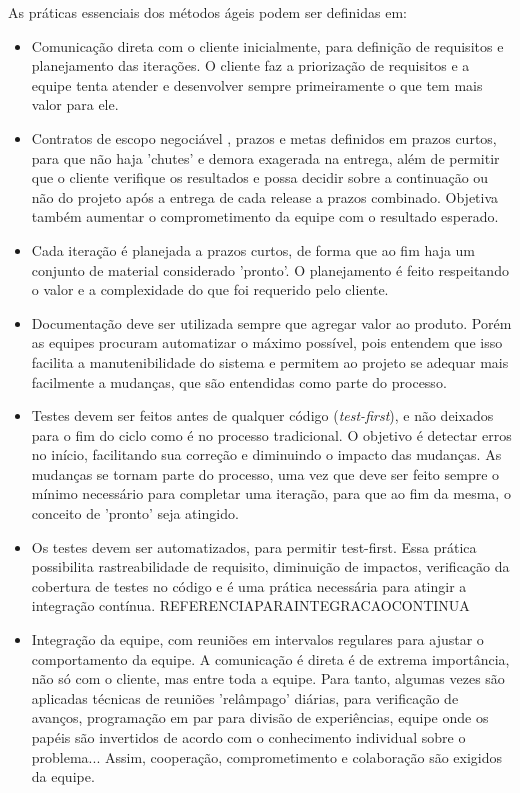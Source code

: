 As práticas essenciais dos métodos ágeis podem ser definidas em:
\begin{itemize}

\item Comunicação direta com o cliente inicialmente, para definição de requisitos e planejamento das iterações. O cliente faz a priorização de requisitos e a equipe tenta atender e desenvolver sempre primeiramente o que tem mais valor para ele. 

\item Contratos de escopo negociável , prazos e metas definidos em prazos curtos, para que não haja 'chutes' e demora exagerada na entrega, além de permitir que o cliente verifique os resultados e possa decidir sobre a continuação ou não do projeto após a entrega de cada release a prazos combinado. Objetiva também aumentar o comprometimento da equipe com o resultado esperado.

\item Cada iteração é planejada a prazos curtos, de forma que ao fim haja um conjunto de material considerado 'pronto'. O planejamento é feito respeitando o valor e a complexidade do que foi requerido pelo cliente.

\item Documentação deve ser utilizada sempre que agregar valor ao produto. Porém as equipes procuram automatizar o máximo possível, pois entendem que isso facilita a manutenibilidade do sistema e permitem ao projeto se adequar mais facilmente a mudanças, que são entendidas como parte do processo.

\item Testes devem ser feitos antes de qualquer código (\textit{test-first}), e não deixados para o fim do ciclo como é no processo tradicional. O objetivo é detectar erros no início, facilitando sua correção e diminuindo o impacto das mudanças. As mudanças se tornam parte do processo, uma vez que deve ser feito sempre o mínimo necessário para completar uma iteração, para que ao fim da mesma, o conceito de 'pronto' seja atingido.

\item Os testes devem ser automatizados, para permitir test-first. Essa prática possibilita rastreabilidade de requisito, diminuição de impactos, verificação da cobertura de testes no código e é uma prática necessária para atingir a integração contínua. REFERENCIAPARAINTEGRACAOCONTINUA

\item Integração da equipe, com reuniões em intervalos regulares para ajustar o comportamento da equipe. A comunicação é direta é de extrema importância, não só com o cliente, mas entre toda a equipe. Para tanto, algumas vezes são aplicadas técnicas de reuniões 'relâmpago' diárias, para verificação de avanços, programação em par para divisão de experiências, equipe onde os papéis são invertidos de acordo com o conhecimento individual sobre o problema... Assim, cooperação, comprometimento e colaboração são exigidos da equipe. 


\end{itemize}
